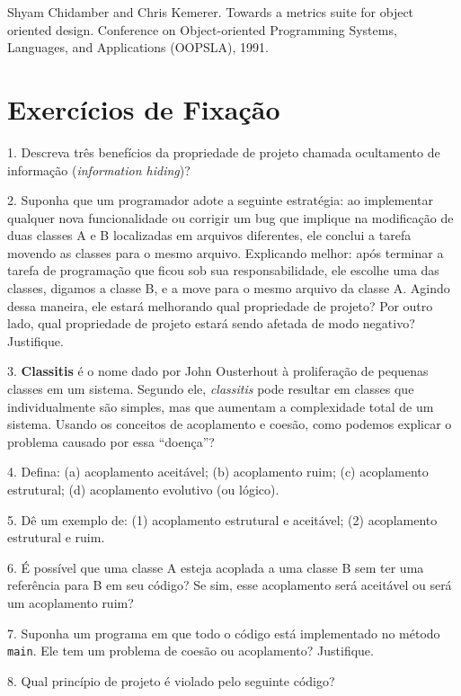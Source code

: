 \documentclass[
  11pt,
  twoside]{book}
\newcommand{\passthrough}[1]{#1}
\begin{document}
Shyam Chidamber and Chris Kemerer. Towards a metrics suite for object
oriented design. Conference on Object-oriented Programming Systems,
Languages, and Applications (OOPSLA), 1991.

\hypertarget{exercuxedcios-de-fixauxe7uxe3o-4}{%
\section*{Exercícios de
Fixação}\label{exercuxedcios-de-fixauxe7uxe3o-4}}

1. Descreva três benefícios da propriedade de projeto chamada
ocultamento de informação (\emph{information hiding})?

2. Suponha que um programador adote a seguinte estratégia: ao
implementar qualquer nova funcionalidade ou corrigir um bug que implique
na modificação de duas classes A e B localizadas em arquivos diferentes,
ele conclui a tarefa movendo as classes para o mesmo arquivo. Explicando
melhor: após terminar a tarefa de programação que ficou sob sua
responsabilidade, ele escolhe uma das classes, digamos a classe B, e a
move para o mesmo arquivo da classe A. Agindo dessa maneira, ele estará
melhorando qual propriedade de projeto? Por outro lado, qual propriedade
de projeto estará sendo afetada de modo negativo? Justifique.

3. \textbf{Classitis} é o nome dado por John Ousterhout
 à proliferação de pequenas classes em um
sistema. Segundo ele, \emph{classitis} pode resultar em classes que
individualmente são simples, mas que aumentam a complexidade total de um
sistema. Usando os conceitos de acoplamento e coesão, como podemos
explicar o problema causado por essa ``doença''?

4. Defina: (a) acoplamento aceitável; (b) acoplamento ruim; (c)
acoplamento estrutural; (d) acoplamento evolutivo (ou lógico).

5. Dê um exemplo de: (1) acoplamento estrutural e aceitável; (2)
acoplamento estrutural e ruim.

6. É possível que uma classe A esteja acoplada a uma classe B sem ter
uma referência para B em seu código? Se sim, esse acoplamento será
aceitável ou será um acoplamento ruim?

7. Suponha um programa em que todo o código está implementado no método
\passthrough{\lstinline!main!}. Ele tem um problema de coesão ou
acoplamento? Justifique.

8. Qual princípio de projeto é violado pelo seguinte código?
\end{document}
